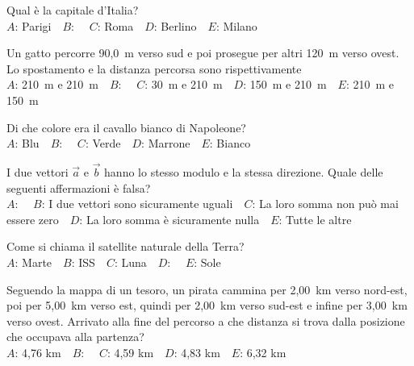 \mcquestionfooter



\def\mcquestionnumber{9}


\mcquestionheader Qual è la capitale d’Italia?\\
{$A$}: Parigi\ \ {$B$}: \ \ {$C$}: Roma\ \ {$D$}: Berlino\ \ {$E$}: Milano\ \ 

\mcquestionfooter



\def\mcquestionnumber{10}


\mcquestionheader Un gatto percorre 90,0~m verso sud e poi prosegue per altri 120~m verso ovest. Lo spostamento e la distanza percorsa sono rispettivamente\\
{$A$}: 210~m e 210~m\ \ {$B$}: \ \ {$C$}: 30~m e 210~m\ \ {$D$}: 150~m e 210~m\ \ {$E$}: 210~m e 150~m\ \ 

\mcquestionfooter



\def\mcquestionnumber{11}


\mcquestionheader Di che colore era il cavallo bianco di Napoleone?\\
{$A$}: Blu\ \ {$B$}: \ \ {$C$}: Verde\ \ {$D$}: Marrone\ \ {$E$}: Bianco\ \ 

\mcquestionfooter



\def\mcquestionnumber{12}


\mcquestionheader I due vettori $\vec{a}$ e $\vec{b}$ hanno lo stesso modulo e la stessa direzione. Quale delle seguenti affermazioni è falsa?\\
{$A$}: \ \ {$B$}: I due vettori sono sicuramente uguali\ \ {$C$}: La loro somma non può mai essere zero\ \ {$D$}: La loro somma è sicuramente nulla\ \ {$E$}: Tutte le altre\ \ 

\mcquestionfooter



\mcpaperfooter

\def\mcserialnumber{33}
\mcpaperheader


\def\mcquestionnumber{1}


\mcquestionheader Come si chiama il satellite naturale della Terra?\\
{$A$}: Marte\ \ {$B$}: ISS\ \ {$C$}: Luna\ \ {$D$}: \ \ {$E$}: Sole\ \ 

\mcquestionfooter



\def\mcquestionnumber{2}


\mcquestionheader Seguendo la mappa di un tesoro, un pirata cammina per 2,00~km verso nord-est, poi per 5,00~km verso est, quindi per 2,00~km verso sud-est e infine per 3,00~km verso ovest. Arrivato alla fine del percorso a che distanza si trova dalla posizione che occupava alla partenza?\\
{$A$}: 4,76 km\ \ {$B$}: \ \ {$C$}: 4,59 km\ \ {$D$}: 4,83 km\ \ {$E$}: 6,32 km\ \ 

